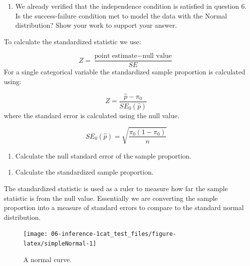\documentclass[
]{report}
\providecommand{\tightlist}{%
  \setlength{\itemsep}{0pt}\setlength{\parskip}{0pt}}
\begin{document}
\begin{enumerate}
\def\labelenumi{\arabic{enumi}.}
\tightlist
\item
  We already verified that the independence condition is satisfied in question 6. Is the success-failure condition met to model the data with the Normal distribution? Show your work to support your answer.
\end{enumerate}

\vspace{1in}

To calculate the standardized statistic we use:

\[
Z = \frac{\text{point estimate} - \text{null value}}{SE}
\]
For a single categorical variable the standardized sample proportion is calculated using:

\[
Z = \frac{\hat{p} - \pi_0}{SE_0(\hat{p})}
\]
where the standard error is calculated using the null value.

\[SE_0(\hat{p})=\sqrt{\frac{\pi_0(1-\pi_0)}{n}}\]
\vspace{0.5mm}

\begin{enumerate}
\def\labelenumi{\arabic{enumi}.}
\setcounter{enumi}{1}
\tightlist
\item
  Calculate the null standard error of the sample proportion.
\end{enumerate}

\vspace{1in}

\begin{enumerate}
\def\labelenumi{\arabic{enumi}.}
\setcounter{enumi}{2}
\tightlist
\item
  Calculate the standardized sample proportion.
\end{enumerate}

\vspace{1in}

The standardized statistic is used as a ruler to measure how far the sample statistic is from the null value. Essentially we are converting the sample proportion into a measure of standard errors to compare to the standard normal distribution.

\begin{figure}

{\centering \texttt{[image: 06-inference-1cat\_test\_files/figure-latex/simpleNormal-1]} 

}

\caption{A normal curve.}\label{fig:simpleNormal}
\end{figure}
\end{document}
